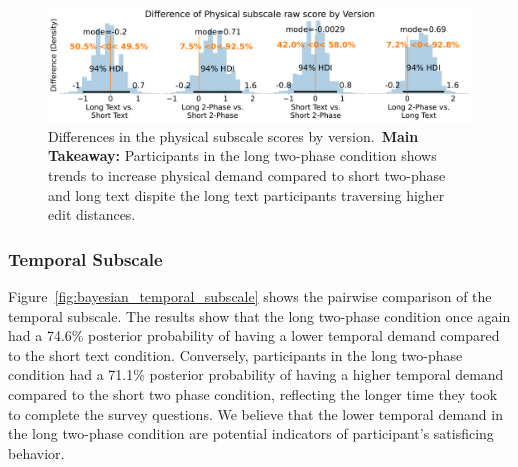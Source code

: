 \begin{figure}[h!]
    \centering
    \includegraphics[width=\textwidth]{content/image/cog/Physical_cog_diff_single_row.pdf}
    \caption{Differences in the physical subscale scores by version.~\textbf{Main Takeaway:} Participants in the long two-phase condition shows trends to increase physical demand compared to short two-phase and long text dispite the long text participants traversing higher edit distances.}
    \label{fig:bayesian_physical_subscale}
\end{figure}

\subsubsection{Temporal Subscale}
\label{sec:temporal_subscale_bayesian}
Figure~\ref{fig:bayesian_temporal_subscale} shows the pairwise comparison of the temporal subscale. The results show that the long two-phase condition once again had a 74.6\% posterior probability of having a lower temporal demand compared to the short text condition. Conversely, participants in the long two-phase condition had a 71.1\% posterior probability of having a higher temporal demand compared to the short two phase condition, reflecting the longer time they took to complete the survey questions. We believe that the lower temporal demand in the long two-phase condition are potential indicators of participant's satisficing behavior.

